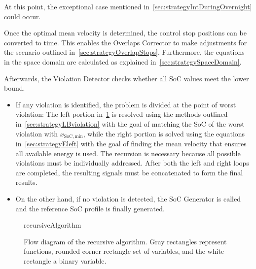 At this point, the exceptional case mentioned in~\cref{sec:strategyIntDuringOvernight} could occur.

Once the optimal mean velocity is determined, the control stop positions can be converted to time. This enables the Overlaps Corrector to make adjustments for the scenario outlined in~\cref{sec:strategyOverlapStops}. Furthermore, the equations in the space domain are calculated as explained in~\cref{sec:strategySpaceDomain}.

Afterwards, the Violation Detector checks whether all SoC values meet the lower bound.
\begin{itemize}
	\item If any violation is identified, the problem is divided at the point of worst violation: The left portion in~\cref{fig:recursiveAlgorithm} is resolved using the methods outlined in~\cref{sec:strategyLBviolation} with the goal of matching the SoC of the worst violation with $x_\mathrm{SoC,min}$, while the right portion is solved using the equations in~\cref{sec:strategyEleft} with the goal of finding the mean velocity that ensures all available energy is used. The recursion is necessary because all possible violations must be individually addressed. After both the left and right loops are completed, the resulting signals must be concatenated to form the final results.
	\item On the other hand, if no violation is detected, the SoC Generator is called and the reference SoC profile is finally generated.
\end{itemize}

\begin{figure}[htbp]
	\centering
	\begin{externalize}{recursiveAlgorithm}
		
	\end{externalize}
	\caption{Flow diagram of the recursive algorithm. Gray rectangles represent functions, rounded-corner rectangle set of variables, and the white rectangle a binary variable.}
	\label{fig:recursiveAlgorithm}
\end{figure}

